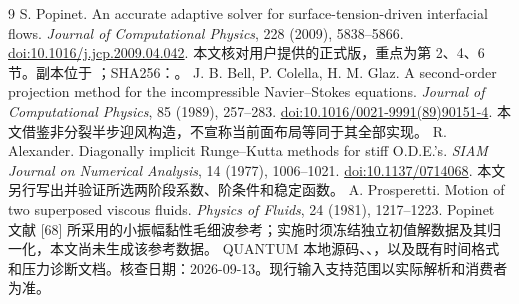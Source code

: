 \documentclass[UTF8,a4paper,11pt,fontset=fandol]{ctexart}
\numberwithin{equation}{section}
\begin{document}
\clearpage
\begin{thebibliography}{9}
 S. Popinet. An accurate adaptive solver for surface-tension-driven interfacial flows. \emph{Journal of Computational Physics}, 228 (2009), 5838--5866. \href{https://doi.org/10.1016/j.jcp.2009.04.042}{doi:10.1016/j.jcp.2009.04.042}. 本文核对用户提供的正式版，重点为第 2、4、6 节。副本位于 ；SHA256：。
 J. B. Bell, P. Colella, H. M. Glaz. A second-order projection method for the incompressible Navier--Stokes equations. \emph{Journal of Computational Physics}, 85 (1989), 257--283. \href{https://doi.org/10.1016/0021-9991(89)90151-4}{doi:10.1016/0021-9991(89)90151-4}. 本文借鉴非分裂半步迎风构造，不宣称当前面布局等同于其全部实现。
 R. Alexander. Diagonally implicit Runge--Kutta methods for stiff O.D.E.'s. \emph{SIAM Journal on Numerical Analysis}, 14 (1977), 1006--1021. \href{https://doi.org/10.1137/0714068}{doi:10.1137/0714068}. 本文另行写出并验证所选两阶段系数、阶条件和稳定函数。
 A. Prosperetti. Motion of two superposed viscous fluids. \emph{Physics of Fluids}, 24 (1981), 1217--1223. Popinet 文献 [68] 所采用的小振幅黏性毛细波参考；实施时须冻结独立初值解数据及其归一化，本文尚未生成该参考数据。
 QUANTUM 本地源码、、，以及既有时间格式和压力诊断文档。核查日期：2026-09-13。现行输入支持范围以实际解析和消费者为准。
\end{thebibliography}
\end{document}
